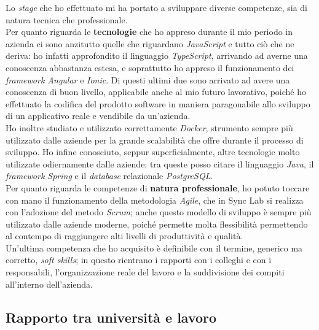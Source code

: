Lo \textit{stage} che ho effettuato mi ha portato a sviluppare diverse competenze, sia di natura tecnica che professionale. \\
Per quanto riguarda le \textbf{tecnologie} che ho appreso durante il mio periodo in azienda ci sono anzitutto quelle che riguardano \textit{JavaScript} e tutto ciò che ne deriva: ho infatti approfondito il linguaggio \textit{TypeScript}, arrivando ad averne una conoscenza abbastanza estesa, e  soprattutto ho appreso il funzionamento dei \textit{framework Angular} e \textit{Ionic}. Di questi ultimi due sono arrivato ad avere una conoscenza di buon livello, applicabile anche al mio futuro lavorativo, poiché ho effettuato la codifica del prodotto software in maniera paragonabile allo sviluppo di un applicativo reale e vendibile da un'azienda. \\
Ho inoltre studiato e utilizzato correttamente \textit{Docker}, strumento sempre più utilizzato dalle aziende per la grande scalabilità che offre durante il processo di sviluppo. Ho infine conosciuto, seppur superficialmente, altre tecnologie molto utilizzate odiernamente dalle aziende; tra queste posso citare il linguaggio \textit{Java}, il \textit{framework Spring} e il \textit{database} relazionale \textit{PostgreSQL}. \\
Per quanto riguarda le competenze di \textbf{natura professionale}, ho potuto toccare con mano il funzionamento della metodologia \textit{Agile}, che in Sync Lab si realizza con l'adozione del metodo \textit{Scrum}; anche questo modello di sviluppo è sempre più utilizzato dalle aziende moderne, poiché permette molta flessibilità permettendo al contempo di raggiungere alti livelli di produttività e qualità. \\
Un'ultima competenza che ho acquisito è definibile con il termine, generico ma corretto, \textit{soft skills}; in questo rientrano i rapporti con i colleghi e con i responsabili, l'organizzazione reale del lavoro e la suddivisione dei compiti all'interno dell'azienda.


\subsection{Rapporto tra università e lavoro}

